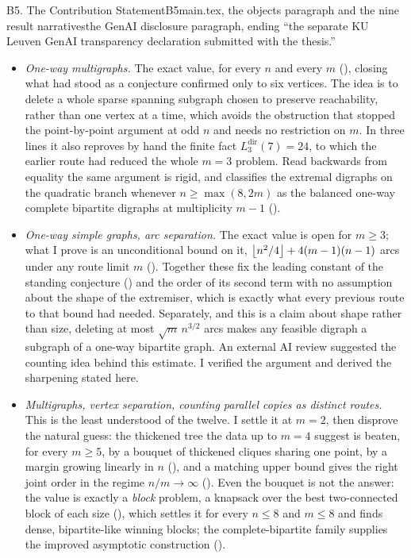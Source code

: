 \begin{offcutrewrite}{B5. The Contribution Statement}{B5}{main.tex, the objects paragraph and the nine result narratives}{the GenAI disclosure paragraph, ending ``the separate KU Leuven GenAI transparency declaration submitted with the thesis.''}
\begin{itemize}
  \item \emph{One-way multigraphs.} The exact value, for every $n$ and every $m$ (), closing what had stood as a conjecture confirmed only to six vertices. The idea is to delete a whole sparse spanning subgraph chosen to preserve reachability, rather than one vertex at a time, which avoids the obstruction that stopped the point-by-point argument at odd $n$ and needs no restriction on $m$. In three lines it also reproves by hand the finite fact $L_3^{\mathrm{dir}}(7) = 24$, to which the earlier route had reduced the whole $m = 3$ problem. Read backwards from equality the same argument is rigid, and classifies the extremal digraphs on the quadratic branch whenever $n \ge \max(8, 2m)$ as the balanced one-way complete bipartite digraphs at multiplicity $m-1$ ().

  \item \emph{One-way simple graphs, arc separation.} The exact value is open for $m \ge 3$; what I prove is an unconditional bound on it, $\left\lfloor n^2/4 \right\rfloor + 4(m-1)(n-1)$ arcs under any route limit $m$ (). Together these fix the leading constant of the standing conjecture () and the order of its second term with no assumption about the shape of the extremiser, which is exactly what every previous route to that bound had needed. Separately, and this is a claim about shape rather than size, deleting at most $\sqrt{m}\,n^{3/2}$ arcs makes any feasible digraph a subgraph of a one-way bipartite graph. An external AI review suggested the counting idea behind this estimate. I verified the argument and derived the sharpening stated here.

  \item \emph{Multigraphs, vertex separation, counting parallel copies as distinct routes.} This is the least understood of the twelve. I settle it at $m = 2$, then disprove the natural guess: the thickened tree the data up to $m = 4$ suggest is beaten, for every $m \ge 5$, by a bouquet of thickened cliques sharing one point, by a margin growing linearly in $n$ (), and a matching upper bound gives the right joint order in the regime $n/m \to \infty$ (). Even the bouquet is not the answer: the value is exactly a \emph{block} problem, a knapsack over the best two-connected block of each size (), which settles it for every $n \le 8$ and $m \le 8$ and finds dense, bipartite-like winning blocks; the complete-bipartite family supplies the improved asymptotic construction ().


\end{itemize}
\end{offcutrewrite}
